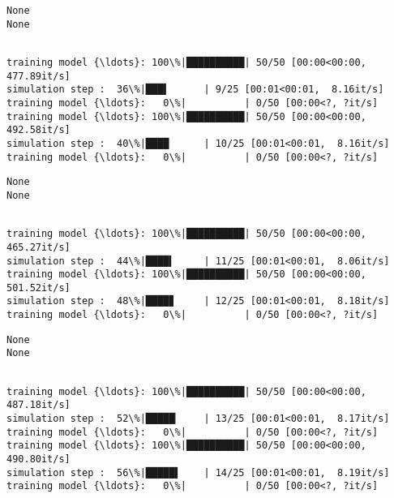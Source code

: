 \documentclass[11pt]{article}
\begin{document}
    \begin{Verbatim}[commandchars=\\\{\}]
None
None
    \end{Verbatim}

    \begin{Verbatim}[commandchars=\\\{\}]

training model {\ldots}: 100\%|██████████| 50/50 [00:00<00:00, 477.89it/s]
simulation step :  36\%|███▌      | 9/25 [00:01<00:01,  8.16it/s]
training model {\ldots}:   0\%|          | 0/50 [00:00<?, ?it/s]
training model {\ldots}: 100\%|██████████| 50/50 [00:00<00:00, 492.58it/s]
simulation step :  40\%|████      | 10/25 [00:01<00:01,  8.16it/s]
training model {\ldots}:   0\%|          | 0/50 [00:00<?, ?it/s]
    \end{Verbatim}

    \begin{Verbatim}[commandchars=\\\{\}]
None
None
    \end{Verbatim}

    \begin{Verbatim}[commandchars=\\\{\}]

training model {\ldots}: 100\%|██████████| 50/50 [00:00<00:00, 465.27it/s]
simulation step :  44\%|████▍     | 11/25 [00:01<00:01,  8.06it/s]
training model {\ldots}: 100\%|██████████| 50/50 [00:00<00:00, 501.52it/s]
simulation step :  48\%|████▊     | 12/25 [00:01<00:01,  8.18it/s]
training model {\ldots}:   0\%|          | 0/50 [00:00<?, ?it/s]
    \end{Verbatim}

    \begin{Verbatim}[commandchars=\\\{\}]
None
None
    \end{Verbatim}

    \begin{Verbatim}[commandchars=\\\{\}]

training model {\ldots}: 100\%|██████████| 50/50 [00:00<00:00, 487.18it/s]
simulation step :  52\%|█████▏    | 13/25 [00:01<00:01,  8.17it/s]
training model {\ldots}:   0\%|          | 0/50 [00:00<?, ?it/s]
training model {\ldots}: 100\%|██████████| 50/50 [00:00<00:00, 490.80it/s]
simulation step :  56\%|█████▌    | 14/25 [00:01<00:01,  8.19it/s]
training model {\ldots}:   0\%|          | 0/50 [00:00<?, ?it/s]
    \end{Verbatim}
\end{document}
